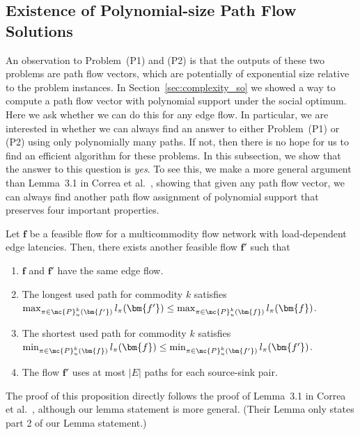 \subsection{Existence of Polynomial-size Path Flow Solutions}
An observation to Problem~(P1) and (P2) is that the outputs of these two problems are path flow vectors, which are potentially of exponential size relative to the problem instances. 
In Section~\ref{sec:complexity_so} we showed a way to compute a path flow vector with polynomial support under the social optimum.  Here we ask whether we can do this for any edge flow.  In particular, we are interested in whether we can always find an answer to either Problem~(P1) or (P2) using only polynomially many paths.  If not, then there is no hope for us to find an efficient algorithm for these problems.  In this subsection, we show that the answer to this question is \emph{yes}.  To see this, we make a more general argument than Lemma~3.1 in Correa et al.~\cite{correa2007fast}, showing that given any path flow vector, we can always find another path flow assignment of polynomial support that preserves four important properties.
\begin{proposition}\label{lemma:correa1}
	Let $\bm{f}$ be a feasible flow for a multicommodity flow network with load-dependent edge latencies. Then, there
	exists another feasible flow $\bm{f}'$ such that 
	\begin{enumerate}
		\item $\bm{f}$ and $\bm{f}'$ have the same edge flow.
		\item The longest used path for commodity $k$ satisfies $\max_{\pi \in \mc{P}_u^k(\bm{f'})} l_{\pi}(\bm{f'}) \le \max_{\pi \in \mc{P}_u^k(\bm{f})} l_{\pi}(\bm{f})$.
		\item The shortest used path for commodity $k$ satisfies $\min_{\pi \in \mc{P}_u^k(\bm{f})} l_{\pi}(\bm{f}) \le \min_{\pi \in \mc{P}_u^k(\bm{f'})} l_{\pi}(\bm{f'})$.
		\item The flow $\bm{f}'$ uses at most $|E|$ paths for each source-sink pair.
	\end{enumerate}
\end{proposition}
\begin{remark}
The proof of this proposition directly follows the proof of Lemma~3.1 in Correa et al.~\cite{correa2007fast}, although our lemma statement is more general. (Their Lemma only states part 2 of our Lemma statement.)
\end{remark}

